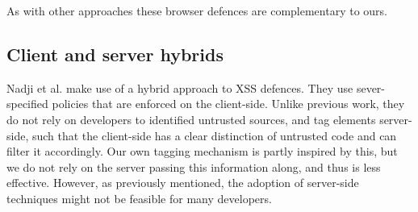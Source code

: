 As with other approaches these browser defences are complementary to ours.

\subsection{Client and server hybrids}
Nadji et al. \cite{Nadji:2009} make use of a hybrid approach to XSS defences. They use sever-specified policies that are enforced on the client-side. Unlike previous work, they do not rely on developers to identified untrusted sources, and tag elements server-side, such that the client-side has a clear distinction of untrusted code and can filter it accordingly. Our own tagging mechanism is partly inspired by this, but we do not rely on the server passing this information along, and thus is less effective. However, as previously mentioned, the adoption of server-side techniques might not be feasible for many developers.

